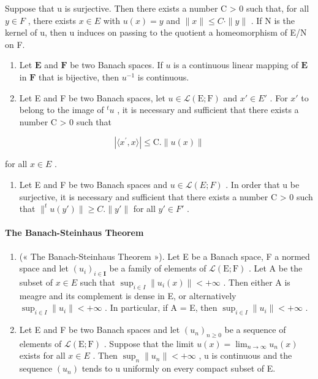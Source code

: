Suppose that u is surjective. Then there exists a number C \textgreater{} 0 such that, for all \(y \in F\) , there exists \(x \in E\) with \(u(x) = y\) and \(\|x\| \leqslant C \cdot \|y\|\) . If N is the kernel of u, then u induces on passing to the quotient a homeomorphism of E/N on F.

\begin{enumerate}
\def\labelenumi{\arabic{enumi})}
\setcounter{enumi}{12}
\item
  Let \(\mathbf{E}\) and \(\mathbf{F}\) be two Banach spaces. If \(u\) is a continuous linear mapping of \(\mathbf{E}\) in \(\mathbf{F}\) that is bijective, then \(u^{-1}\) is continuous.
\item
  Let E and F be two Banach spaces, let \(u \in \mathcal{L}(\mathrm{E}; \mathrm{F})\) and \(x' \in E'\) . For \(x'\) to belong to the image of \(^{t}u\) , it is necessary and sufficient that there exists a number C \textgreater{} 0 such that
\end{enumerate}

\[
\left| \langle x ^ {\prime}, x \rangle \right| \leqslant \mathrm{C.} \| u (x) \|\tag{7}
\]

for all \(x \in E\) .

\begin{enumerate}
\def\labelenumi{(\arabic{enumi})}
\setcounter{enumi}{14}
\tightlist
\item
   Let E and F be two Banach spaces and \(u \in \mathcal{L}(E; F)\) . In order that u be surjective, it is necessary and sufficient that there exists a number C \textgreater{} 0 such that \(\|^{t}u(y')\| \geqslant C. \|y'\|\) for all \(y' \in F'\) .
\end{enumerate}

\paragraph{The Banach-Steinhaus Theorem}

\begin{enumerate}
\def\labelenumi{\arabic{enumi})}
\setcounter{enumi}{15}
\item
  (« The Banach-Steinhaus Theorem »). Let E be a Banach space, F a normed space and let \((u_{i})_{i\in\mathbf{I}}\) be a family of elements of \(\mathcal{L}(\mathrm{E};\mathrm{F})\) . Let A be the subset of \(x\in E\) such that \(\sup_{i\in I}\|u_{i}(x)\|<+\infty\) . Then either A is meagre and its complement is dense in E, or alternatively \(\sup_{i\in I}\|u_{i}\|<+\infty\) . In particular, if A = E, then \(\sup_{i\in I}\|u_{i}\|<+\infty\) .
\item
  Let E and F be two Banach spaces and let \((u_{n})_{n\geq0}\) be a sequence of elements of \(\mathcal{L}(\mathrm{E};\mathrm{F})\) . Suppose that the limit \(u(x)=\lim_{n\to\infty}u_{n}(x)\) exists for all \(x\in E\) . Then \(\sup_{n}\|u_{n}\|<+\infty\) , u is continuous and the sequence \((u_{n})\) tends to u uniformly on every compact subset of E.
\end{enumerate}

